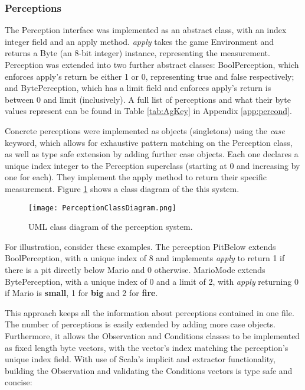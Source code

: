 \subsubsection{Perceptions}

The Perception interface was implemented as an abstract class, with an index integer field and an apply method. \emph{apply} takes the game Environment and returns a Byte (an 8-bit integer) instance, representing the measurement. Perception was extended into two further abstract classes: BoolPerception, which enforces apply's return be either 1 or 0, representing true and false respectively; and BytePerception, which has a limit field and enforces apply's return is between 0 and limit (inclusively). A full list of perceptions and what their byte values represent can be found in Table \ref{tab:AgKey} in Appendix \ref{app:percond}.

Concrete perceptions were implemented as objects (singletons) using the \emph{case} keyword, which allows for exhaustive pattern matching on the Perception class, as well as type safe extension by adding further case objects. Each one declares a unique index integer to the Perception superclass (starting at 0 and increasing by one for each). They implement the apply method to return their specific measurement. Figure \ref{fig:percumlcd} shows a class diagram of the this system.

\begin{figure}[t]
	\centering
	\texttt{[image: PerceptionClassDiagram.png]}
	\caption{UML class diagram of the perception system.}
	\label{fig:percumlcd}
\end{figure}

For illustration, consider these examples. The perception PitBelow extends BoolPerception, with a unique index of 8 and implements \emph{apply} to return 1 if there is a pit directly below Mario and 0 otherwise. MarioMode extends BytePerception, with a unique index of 0 and a limit of 2, with \emph{apply} returning 0 if Mario is \textbf{small}, 1 for \textbf{big} and 2 for \textbf{fire}.

This approach keeps all the information about perceptions contained in one file. The number of perceptions is easily extended by adding more case objects. Furthermore, it allows the Observation and Conditions classes to be implemented as fixed length byte vectors, with the vector's index matching the perception's unique index field. With use of Scala's implicit and extractor functionality, building the Observation and validating the Conditions vectors is type safe and concise:


